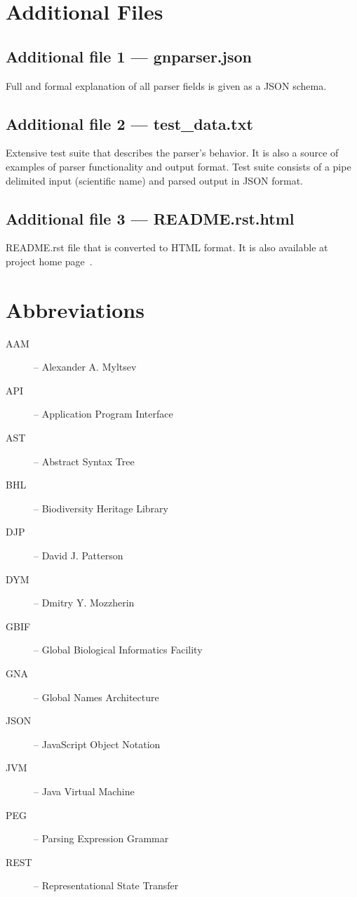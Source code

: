 \documentclass{bmcart}
\begin{document}
\section*{Additional Files}

  \subsection*{Additional file 1 --- gnparser.json} Full and formal explanation of all parser fields is given as a JSON schema.

  \subsection*{Additional file 2 --- test\_data.txt} Extensive test suite that describes the parser's behavior. It is also a source of examples of parser functionality and output format.  Test suite consists of a pipe delimited input (scientific name) and parsed output in JSON format.

  \subsection*{Additional file 3 --- README.rst.html} README.rst file that is converted to HTML format. It is also available at project home page~\cite{gnparser}.

\section*{Abbreviations}

\begin{description}
  \item[AAM] -- Alexander A. Myltsev
  \item[API] -- Application Program Interface
  \item[AST] -- Abstract Syntax Tree
  \item[BHL] -- Biodiversity Heritage Library
  \item[DJP] -- David J. Patterson
  \item[DYM] -- Dmitry Y. Mozzherin
  \item[GBIF] -- Global Biological Informatics Facility
  \item[GNA] -- Global Names Architecture
  \item[JSON] -- JavaScript Object Notation
  \item[JVM] -- Java Virtual Machine
  \item[PEG] -- Parsing Expression Grammar
  \item[REST] -- Representational State Transfer
\end{description}
\end{document}

